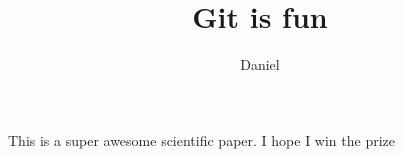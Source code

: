\documentclass[10pt]{article}
\author{Daniel}
\title{Git is fun}
\begin{document}
		\maketitle
		
		This is a super awesome scientific paper.
		I hope I win the prize
		
\end{document}
